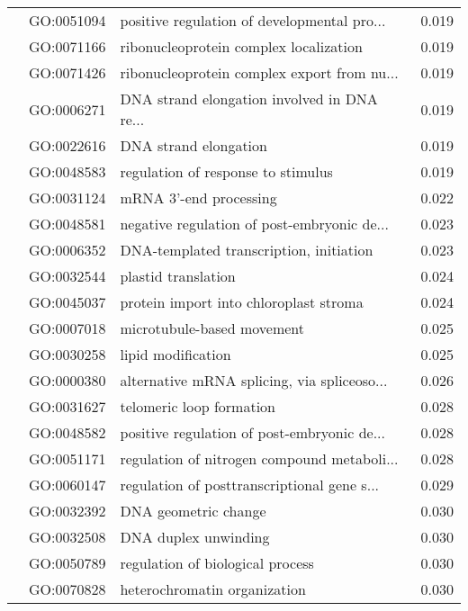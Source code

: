 \begin{longtable}{lllr}
   & GO:0051094 &  positive regulation of developmental pro... &         0.019 \\
   & GO:0071166 &       ribonucleoprotein complex localization &         0.019 \\
   & GO:0071426 &  ribonucleoprotein complex export from nu... &         0.019 \\
   & GO:0006271 &  DNA strand elongation involved in DNA re... &         0.019 \\
   & GO:0022616 &                        DNA strand elongation &         0.019 \\
   & GO:0048583 &           regulation of response to stimulus &         0.019 \\
   & GO:0031124 &                       mRNA 3'-end processing &         0.022 \\
   & GO:0048581 &  negative regulation of post-embryonic de... &         0.023 \\
   & GO:0006352 &      DNA-templated transcription, initiation &         0.023 \\
   & GO:0032544 &                          plastid translation &         0.024 \\
   & GO:0045037 &       protein import into chloroplast stroma &         0.024 \\
   & GO:0007018 &                   microtubule-based movement &         0.025 \\
   & GO:0030258 &                           lipid modification &         0.025 \\
   & GO:0000380 &  alternative mRNA splicing, via spliceoso... &         0.026 \\
   & GO:0031627 &                     telomeric loop formation &         0.028 \\
   & GO:0048582 &  positive regulation of post-embryonic de... &         0.028 \\
   & GO:0051171 &  regulation of nitrogen compound metaboli... &         0.028 \\
   & GO:0060147 &  regulation of posttranscriptional gene s... &         0.029 \\
   & GO:0032392 &                         DNA geometric change &         0.030 \\
   & GO:0032508 &                         DNA duplex unwinding &         0.030 \\
   & GO:0050789 &             regulation of biological process &         0.030 \\
   & GO:0070828 &                 heterochromatin organization &         0.030 \\

\end{longtable}
